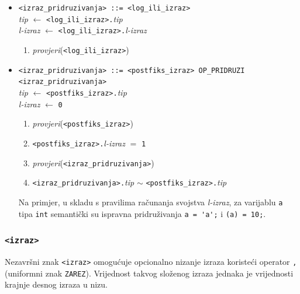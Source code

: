 \documentclass[times, 12pt, utf8]{book}
\begin{document}
\begin{itemize}

\item
\verb|<izraz_pridruzivanja> ::= <log_ili_izraz>|\\
\emph{tip} \(\leftarrow\) \verb|<log_ili_izraz>.|\emph{tip}\\
\emph{l-izraz} \(\leftarrow\) \verb|<log_ili_izraz>.|\emph{l-izraz}
\begin{enumerate}
\item
\emph{provjeri}(\verb|<log_ili_izraz>|)
\end{enumerate}

\item
\verb#<izraz_pridruzivanja> ::= <postfiks_izraz> OP_PRIDRUZI <izraz_pridruzivanja>#\\
\emph{tip} \(\leftarrow\) \verb|<postfiks_izraz>.|\emph{tip}\\
\emph{l-izraz} \(\leftarrow\) \verb|0|
\begin{enumerate}
\item
\emph{provjeri}(\verb|<postfiks_izraz>|)
\item
\verb|<postfiks_izraz>.|\emph{l-izraz} \(=\) \verb|1|
\item
\emph{provjeri}(\verb|<izraz_pridruzivanja>|)
\item
\verb|<izraz_pridruzivanja>.|\emph{tip} \(\sim\) \verb|<postfiks_izraz>.|\emph{tip}
\end{enumerate}

Na primjer, u skladu s pravilima računanja svojstva \emph{l-izraz}, za varijablu \verb|a| tipa \verb|int| semantički su ispravna pridruživanja \verb|a = 'a';| i \verb|(a) = 10;|.

\end{itemize}

\subsubsection{\texttt{<izraz>}}

Nezavršni znak \verb|<izraz>| omogućuje opcionalno nizanje izraza koristeći operator \verb|,| (uniformni znak \verb|ZAREZ|).
Vrijednost takvog složenog izraza jednaka je vrijednosti krajnje desnog izraza u nizu.
\end{document}
